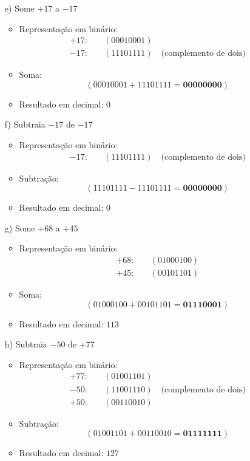 \documentclass[a4paper, 12pt]{article}
\begin{document}
\begin{enumerate}
    \item[e)] Some \(+17\) a \(-17\)
    \begin{itemize}
        \item Representação em binário:
        \begin{align*}
            +17: & \quad (00010001) \\
            -17: & \quad (11101111) \quad \text{(complemento de dois)}
        \end{align*}
        \item Soma:
        \[
        (00010001 + 11101111 = \mathbf{00000000})
        \]
        \item Resultado em decimal: \(0\)
    \end{itemize}

    \item[f)] Subtraia \(-17\) de \(-17\)
    \begin{itemize}
        \item Representação em binário:
        \begin{align*}
            -17: & \quad (11101111) \quad \text{(complemento de dois)}
        \end{align*}
        \item Subtração:
        \[
        (11101111 - 11101111 = \mathbf{00000000})
        \]
        \item Resultado em decimal: \(0\)
    \end{itemize}

    \item[g)] Some \(+68\) a \(+45\)
    \begin{itemize}
        \item Representação em binário:
        \begin{align*}
            +68: & \quad (01000100) \\
            +45: & \quad (00101101)
        \end{align*}
        \item Soma:
        \[
        (01000100 + 00101101 = \mathbf{01110001})
        \]
        \item Resultado em decimal: \(113\)
    \end{itemize}

    \item[h)] Subtraia \(-50\) de \(+77\)
    \begin{itemize}
        \item Representação em binário:
        \begin{align*}
            +77: & \quad (01001101) \\
            -50: & \quad (11001110) \quad \text{(complemento de dois)} \\
            +50: & \quad (00110010)
        \end{align*}
        \item Subtração:
        \[
        (01001101 + 00110010 = \mathbf{01111111})
        \]
        \item Resultado em decimal: \(127\)
    \end{itemize}
\end{enumerate}
\end{document}
